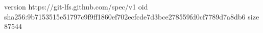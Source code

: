 version https://git-lfs.github.com/spec/v1
oid sha256:9b7153515e51797c9f9ff1860ef702ecfcde7d3bce278559fd0cf7789d7a8db6
size 87544
